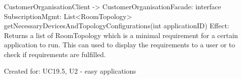                       CustomerOrganisationClient -> CustomerOrganisationFacade: interface SubscriptionMgmt: List<RoomTopology> getNecessaryDevicesAndTopologyConfigurations(int applicationID)
                          Effect: Returns a list of RoomTopology which is a minimal requirement for a certain application to run. This can used to display the requirements to a user or to check if requirements are fulfilled.
                          \item Created for: UC19.5, U2 - easy applications
